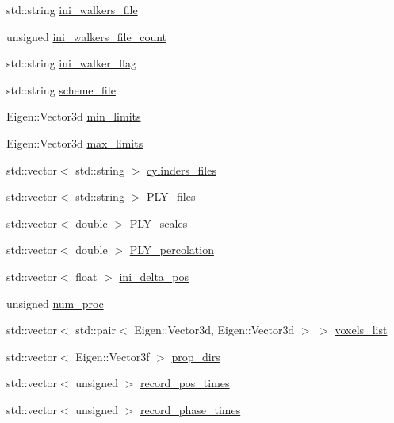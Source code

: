 \begin{DoxyCompactItemize}
\item 
std\+::string \hyperlink{class_parameters_a84db69d29321fccb7cc7ea724a74df50}{ini\+\_\+walkers\+\_\+file}
\item 
unsigned \hyperlink{class_parameters_ae01ac4f7d6d3b9eea6799f5c929ddf00}{ini\+\_\+walkers\+\_\+file\+\_\+count}
\item 
std\+::string \hyperlink{class_parameters_a87cb2db5b45bf9cb36e74903fecfaa6e}{ini\+\_\+walker\+\_\+flag}
\item 
std\+::string \hyperlink{class_parameters_afbb7caab773abb16753263a0b04c8a2c}{scheme\+\_\+file}
\item 
Eigen\+::\+Vector3d \hyperlink{class_parameters_aa9d387477810c2bb574b83ecd1fbf8f0}{min\+\_\+limits}
\item 
Eigen\+::\+Vector3d \hyperlink{class_parameters_a879b4c717e0f59c9bbc4b7810b8fdde3}{max\+\_\+limits}
\item 
std\+::vector$<$ std\+::string $>$ \hyperlink{class_parameters_abdef3b0fe62c5fdca7d417d01edd7422}{cylinders\+\_\+files}
\item 
std\+::vector$<$ std\+::string $>$ \hyperlink{class_parameters_a76984fe140c1c6c8a047dd622561200d}{P\+L\+Y\+\_\+files}
\item 
std\+::vector$<$ double $>$ \hyperlink{class_parameters_a97ed7a4d1b6c6ea8f6507a6a0fc04698}{P\+L\+Y\+\_\+scales}
\item 
std\+::vector$<$ double $>$ \hyperlink{class_parameters_a67f6e450517ee21255d72d41bc9f0ce7}{P\+L\+Y\+\_\+percolation}
\item 
std\+::vector$<$ float $>$ \hyperlink{class_parameters_aea1568fbc8a92bd90303ea8afc9e8c63}{ini\+\_\+delta\+\_\+pos}
\item 
unsigned \hyperlink{class_parameters_aab0de21efc3f85e5c44205ed5ebf9d4d}{num\+\_\+proc}
\item 
std\+::vector$<$ std\+::pair$<$ Eigen\+::\+Vector3d, Eigen\+::\+Vector3d $>$ $>$ \hyperlink{class_parameters_aefbd07d8501ebb9311bbb1ea7c37be26}{voxels\+\_\+list}
\item 
std\+::vector$<$ Eigen\+::\+Vector3f $>$ \hyperlink{class_parameters_a4bbfed0148cec6e10d0e90d85437a37a}{prop\+\_\+dirs}
\item 
std\+::vector$<$ unsigned $>$ \hyperlink{class_parameters_a4f884a7effd3a8816c78084ff3c2b202}{record\+\_\+pos\+\_\+times}
\item 
std\+::vector$<$ unsigned $>$ \hyperlink{class_parameters_a559e66b65a2cb4391d1099bf0db6ec44}{record\+\_\+phase\+\_\+times}
\item 

\end{DoxyCompactItemize}
